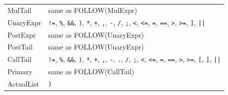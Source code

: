 \documentclass[12pt,a4paper]{article}
\begin{document}
\begin{longtable}{lp{10cm}}
MulTail        & same as FOLLOW(MulExpr) \\
UnaryExpr      & \texttt{!=}, \texttt{\%}, \texttt{\&\&}, \texttt{)}, \texttt{*}, \texttt{+}, \texttt{,}, \texttt{-}, \texttt{/}, \texttt{;}, \texttt{<}, \texttt{<=}, \texttt{=}, \texttt{==}, \texttt{>}, \texttt{>=}, \texttt{]}, \texttt{||} \\
PostExpr       & same as FOLLOW(UnaryExpr) \\
PostTail       & same as FOLLOW(UnaryExpr) \\
CallTail       & \texttt{!=}, \texttt{\%}, \texttt{\&\&}, \texttt{)}, \texttt{*}, \texttt{+}, \texttt{,}, \texttt{-}, \texttt{.}, \texttt{/}, \texttt{;}, \texttt{<}, \texttt{<=}, \texttt{=}, \texttt{==}, \texttt{>}, \texttt{>=}, \texttt{[}, \texttt{]}, \texttt{||} \\
Primary        & same as FOLLOW(CallTail) \\
ActualList     & \texttt{)} \\
\end{longtable}
\end{document}
